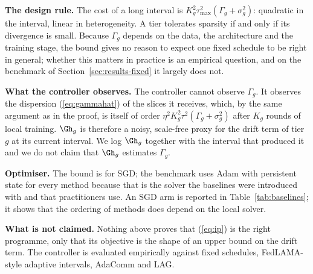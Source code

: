\textbf{The design rule.} The cost of a long interval is $K_g^2\tau_{\max}^2(\Gamma_g+\sigma_g^2)$: quadratic in the interval, linear in heterogeneity. A tier tolerates sparsity if and only if its divergence is small. Because $\Gamma_g$ depends on the data, the architecture and the training stage, the bound gives no reason to expect one fixed schedule to be right in general; whether this matters in practice is an empirical question, and on the benchmark of Section~\ref{sec:results-fixed} it largely does not.

\textbf{What the controller observes.} The controller cannot observe $\Gamma_g$. It observes the dispersion (\ref{eq:gammahat}) of the slices it receives, which, by the same argument as in the proof, is itself of order $\eta^2K_g^2\tau^2(\Gamma_g+\sigma_g^2)$ after $K_g$ rounds of local training. $\Gh_g$ is therefore a noisy, scale-free proxy for the drift term of tier $g$ at its current interval. We log $\Gh_g$ together with the interval that produced it and we do not claim that $\Gh_g$ estimates $\Gamma_g$.

\textbf{Optimiser.} The bound is for SGD; the benchmark uses Adam with persistent state for every method because that is the solver the baselines were introduced with and that practitioners use. An SGD arm is reported in Table~\ref{tab:baselines}; it shows that the ordering of methods does depend on the local solver.

\textbf{What is not claimed.} Nothing above proves that (\ref{eq:ip}) is the right programme, only that its objective is the shape of an upper bound on the drift term. The controller is evaluated empirically against fixed schedules, FedLAMA-style adaptive intervals, AdaComm and LAG.
